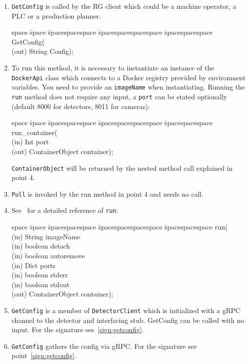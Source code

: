 \begin{enumerate}
    \item \texttt{GetConfig} is called by the RG client which could be a machine operator, a PLC or a production planner. \begin{tabbing}
            space \= space \= spacespacespace \= spacespacespacespace \= spacespacespace \kill
            \>  GetConfig(\\
            \>  \>  (out)	 \> 	String           \> Config); 
        \end{tabbing} \label{sign:getconfig}
        
    \item To run this method, it is necessary to instantiate an instance of the \texttt{DockerApi} class which connects to a Docker registry provided by environment variables. You need to provide an \texttt{imageName} when instantiating. Running the \texttt{run} method does not require any input, a \texttt{port} can be stated optionally (default 8000 for detectors, 8011 for cameras): \begin{tabbing}
    space \= space \= spacespacespace \= spacespacespacespace \= spacespacespace \kill
    \>  run\_container(\\
    \>  \>  (in)	 \> 	Int          \> port\\
    \>  \>  (out)	 \> 	ContainerObject           \> container); 
    \end{tabbing}
    \texttt{ContainerObject} will be returned by the nested method call explained in point 4. \label{sign:runcontainer}
    \item \texttt{Pull} is invoked by the run method in point 4 and needs no call. \label{sign:pull}
    \item See~\cite{N.A.Docker2019} for a detailed reference of \texttt{run}: 
    \begin{tabbing}
    space \= space \= spacespacespace \= spacespacespacespace \= spacespacespace \kill
    \>  run(\\
    \>  \>  (in)	 \> 	String          \> imageName\\
    \>  \>  (in)	 \> 	boolean          \> detach\\
    \>  \>  (in)	 \> 	boolean    \> autoremove\\
    \>  \>  (in)	 \> 	Dict   \> ports\\
    \>  \>  (in)	 \> 	boolean   \> stderr\\
    \>  \>  (in)	 \> 	boolean          \> stdout\\
    \>  \>  (out)	 \> 	ContainerObject           \> container); 
    \end{tabbing}\label{sign:run}
    \item \texttt{GetConfig} is a member of \texttt{DetectorClient} which is initialized with a gRPC channel to the detector and interfacing stub. GetConfig can be called with no input. For the signature see~\ref{sign:getconfig}.
    \item \texttt{GetConfig} gathers the config via gRPC. For the signature see point~\ref{sign:getconfig}.
\end{enumerate}


